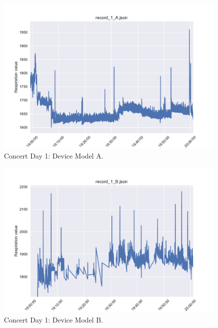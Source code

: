 \begin{figure}
    \centering
    \includegraphics[scale=0.6]{images/record_1_a.pdf}
    \caption{Concert Day 1: Device Model A.}
    \label{fig:concert_day1_a}
\end{figure}

\begin{figure}
    \centering
    \includegraphics[scale=0.6]{images/record_1_b.pdf}
    \caption{Concert Day 1: Device Model B.}
    \label{fig:concert_day1_b}
\end{figure}


